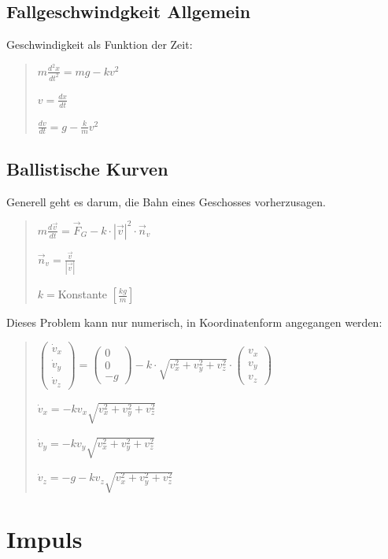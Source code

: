 \subsection*{Fallgeschwindgkeit Allgemein}

Geschwindigkeit als Funktion der Zeit:
\begin{verse}
$m\frac{d^{2}x}{dt^{2}}=mg-kv^{2}$

$v=\frac{dx}{dt}$

$\frac{dv}{dt}=g-\frac{k}{m}v^{2}$
\end{verse}

\subsection*{Ballistische Kurven}

Generell geht es darum, die Bahn eines Geschosses vorherzusagen.
\begin{verse}
$m\frac{d\vec{v}}{dt}=\vec{F}_{G}-k\cdot|\vec{v}|^{2}\cdot\vec{n}_{v}$

$\vec{n}_{v}=\frac{\vec{v}}{|\vec{v}|}$

$k=$Konstante $\left[\frac{kg}{m}\right]$
\end{verse}
Dieses Problem kann nur numerisch, in Koordinatenform angegangen werden:
\begin{verse}
$\left(\begin{array}{c}
\dot{v}_{x}\\
\dot{v}_{y}\\
\dot{v}_{z}
\end{array}\right)=\left(\begin{array}{c}
0\\
0\\
-g
\end{array}\right)-k\cdot\sqrt{v_{x}^{2}+v_{y}^{2}+v_{z}^{2}}\cdot\left(\begin{array}{c}
v_{x}\\
v_{y}\\
v_{z}
\end{array}\right)$

$\dot{v}_{x}=-kv_{x}\sqrt{v_{x}^{2}+v_{y}^{2}+v_{z}^{2}}$

$\dot{v}_{y}=-kv_{y}\sqrt{v_{x}^{2}+v_{y}^{2}+v_{z}^{2}}$

$\dot{v}_{z}=-g-kv_{z}\sqrt{v_{x}^{2}+v_{y}^{2}+v_{z}^{2}}$
\end{verse}

\section*{Impuls}


